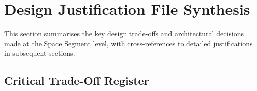 \section{Design Justification File Synthesis}
\label{sec:ddjf_synthesis}

This section summarises the key design trade-offs and architectural decisions made at the Space Segment level, with cross-references to detailed justifications in subsequent sections.

\subsection{Critical Trade-Off Register}


